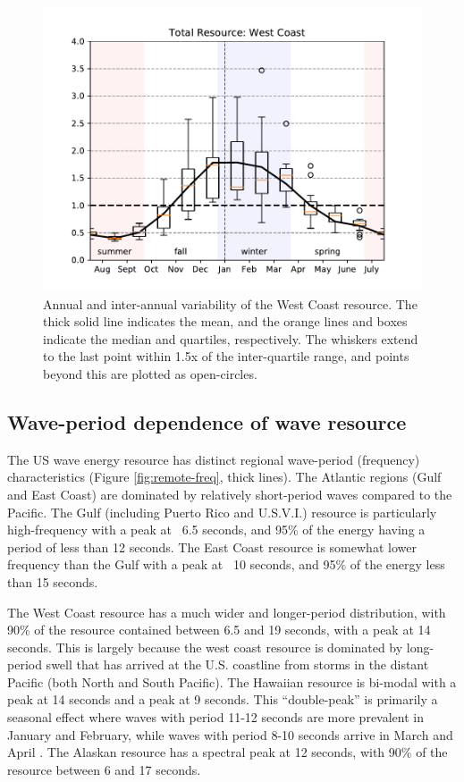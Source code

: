 \begin{figure}[ht]
  \centering
  \includegraphics[width=\textwidth]{../fig/AnnualVar01.wc.pdf}
  \caption[West Coast resource variability.]{Annual and inter-annual variability of the West Coast resource. The thick solid line indicates the mean, and the orange lines and boxes indicate the median and quartiles, respectively. The whiskers extend to the last point within 1.5x of the inter-quartile range, and points beyond this are plotted as open-circles.}
  \label{fig:wc-variability}
\end{figure}

\subsection{Wave-period dependence of wave resource}

The US wave energy resource has distinct regional wave-period (frequency) characteristics (Figure \ref{fig:remote-freq}, thick lines). The Atlantic regions (Gulf and East Coast) are dominated by relatively short-period waves compared to the Pacific. The Gulf (including Puerto Rico and U.S.V.I.) resource is particularly high-frequency with a peak at ~6.5 seconds, and 95\% of the energy having a period of less than 12 seconds. The East Coast resource is somewhat lower frequency than the Gulf with a peak at ~10 seconds, and 95\% of the energy less than 15 seconds.

The West Coast resource has a much wider and longer-period distribution, with 90\% of the resource contained between 6.5 and 19 seconds, with a peak at 14 seconds. This is largely because the west coast resource is dominated by long-period swell that has arrived at the U.S. coastline from storms in the distant Pacific (both North and South Pacific). The Hawaiian resource is bi-modal with a peak at 14 seconds and a peak at 9 seconds. This ``double-peak'' is primarily a seasonal effect where waves with period 11-12 seconds are more prevalent in January and February, while waves with period 8-10 seconds arrive in March and April \citep[][]{stopa2013wave}. The Alaskan resource has a spectral peak at 12 seconds, with 90\% of the resource between 6 and 17 seconds.

